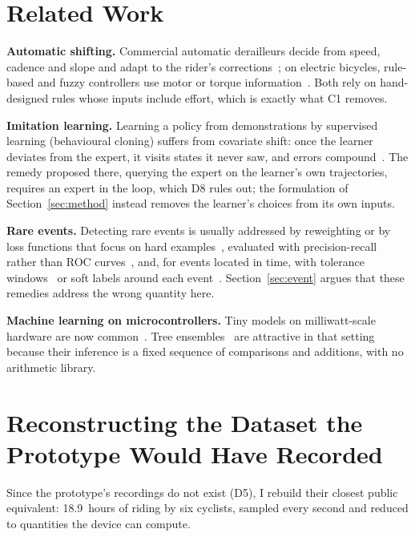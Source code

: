 \documentclass[conference]{IEEEtran}
\begin{document}
\section{Related Work}
\textbf{Automatic shifting.} Commercial automatic derailleurs decide from speed, cadence and slope and adapt to the rider's corrections~\cite{qauto}; on electric bicycles, rule-based and fuzzy controllers use motor or torque information~\cite{fuzzy}. Both rely on hand-designed rules whose inputs include effort, which is exactly what C1 removes.

\textbf{Imitation learning.} Learning a policy from demonstrations by supervised learning (behavioural cloning) suffers from covariate shift: once the learner deviates from the expert, it visits states it never saw, and errors compound~\cite{dagger}. The remedy proposed there, querying the expert on the learner's own trajectories, requires an expert in the loop, which D8 rules out; the formulation of Section~\ref{sec:method} instead removes the learner's choices from its own inputs.

\textbf{Rare events.} Detecting rare events is usually addressed by reweighting or by loss functions that focus on hard examples~\cite{focal}, evaluated with precision-recall rather than ROC curves~\cite{saito}, and, for events located in time, with tolerance windows~\cite{mesaros} or soft labels around each event~\cite{cioppa}. Section~\ref{sec:event} argues that these remedies address the wrong quantity here.

\textbf{Machine learning on microcontrollers.} Tiny models on milliwatt-scale hardware are now common~\cite{tinyml,mlperftiny}. Tree ensembles~\cite{xgboost} are attractive in that setting because their inference is a fixed sequence of comparisons and additions, with no arithmetic library.

\section{Reconstructing the Dataset the Prototype Would Have Recorded}\label{sec:data}
Since the prototype's recordings do not exist (D5), I rebuild their closest public equivalent: 18.9~hours of riding by six cyclists, sampled every second and reduced to quantities the device can compute.
\end{document}
